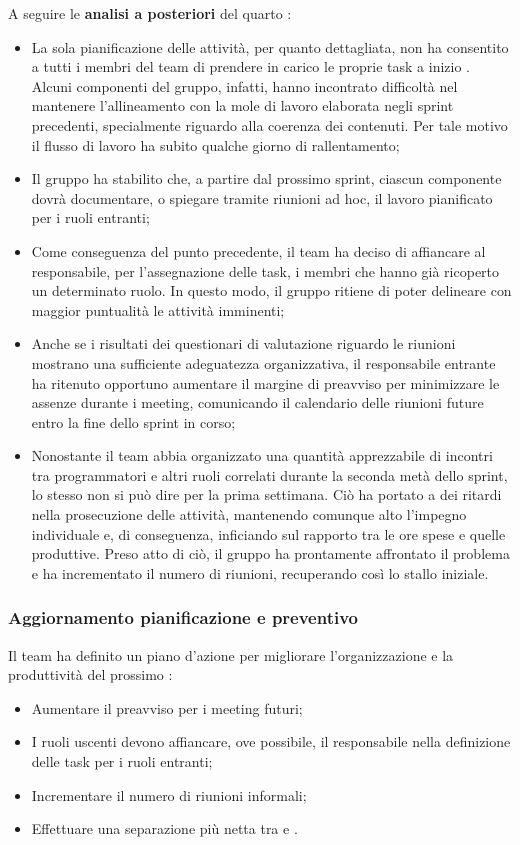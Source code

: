 \vspace{0.5\baselineskip}
\par A seguire le \textbf{analisi a posteriori} del quarto :
\begin{itemize}
  \item La sola pianificazione delle attività, per quanto dettagliata, non ha consentito a tutti i membri del team di prendere in carico le proprie task a inizio . Alcuni componenti del gruppo, infatti, hanno incontrato difficoltà nel mantenere l'allineamento con la mole di lavoro elaborata negli sprint precedenti, specialmente riguardo alla coerenza dei contenuti. Per tale motivo il flusso di lavoro ha subito qualche giorno di rallentamento;
\item Il gruppo ha stabilito che, a partire dal prossimo sprint, ciascun componente dovrà documentare, o spiegare tramite riunioni ad hoc, il lavoro pianificato per i ruoli entranti;
  \item Come conseguenza del punto precedente, il team ha deciso di affiancare al responsabile, per l'assegnazione delle task, i membri che hanno già ricoperto un determinato ruolo. In questo modo, il gruppo ritiene di poter delineare con maggior puntualità le attività imminenti;
  \item Anche se i risultati dei questionari di valutazione riguardo le riunioni mostrano una sufficiente adeguatezza organizzativa, il responsabile entrante ha ritenuto opportuno aumentare il margine di preavviso per minimizzare le assenze durante i meeting, comunicando il calendario delle riunioni future entro la fine dello sprint in corso;
  \item Nonostante il team abbia organizzato una quantità apprezzabile di incontri tra programmatori e altri ruoli correlati durante la seconda metà dello sprint, lo stesso non si può dire per la prima settimana. Ciò ha portato a dei ritardi nella prosecuzione delle attività, mantenendo comunque alto l'impegno individuale e, di conseguenza, inficiando sul rapporto tra le ore spese e quelle produttive. Preso atto di ciò, il gruppo ha prontamente affrontato il problema e ha incrementato il numero di riunioni, recuperando così lo stallo iniziale.
\end{itemize}

\subsubsection{Aggiornamento pianificazione e preventivo}
\par Il team ha definito un piano d'azione per migliorare l'organizzazione e la produttività del prossimo :
\begin{itemize}
  \item Aumentare il preavviso per i meeting futuri;
  \item I ruoli uscenti devono affiancare, ove possibile, il responsabile nella definizione delle task per i ruoli entranti;
  \item Incrementare il numero di riunioni informali;
  \item Effettuare una separazione più netta tra  e .
\end{itemize}


